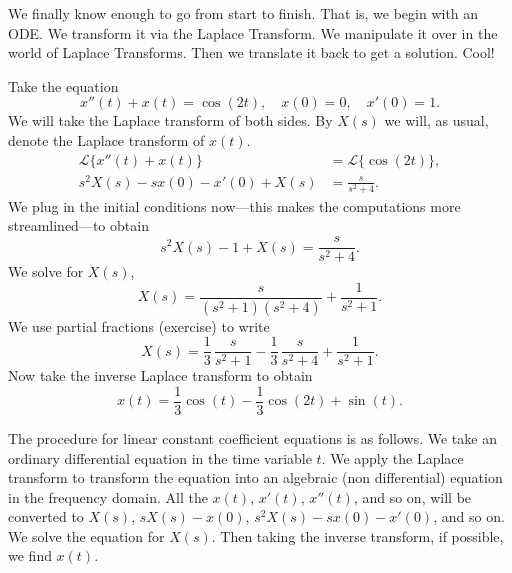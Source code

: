 \begin{video}
	We finally know enough to go from start to finish. That is, we begin with an ODE. We transform it via the Laplace Transform. We manipulate it over in the world of Laplace Transforms. Then we translate it back to get a solution. Cool!
\end{video}

\begin{example}
Take the equation
\begin{equation*}
x''(t) + x(t) = \cos (2t), \quad x(0) = 0, \quad x'(0) = 1 .
\end{equation*}
We will take the Laplace transform of both sides.
By $X(s)$ we will, as usual, denote the Laplace transform of
$x(t)$.
\begin{align*}
\mathcal{L} \bigl\{ x''(t) + x(t) \bigr\} & = \mathcal{L} \bigl\{ \cos (2t) \bigr\} , \\
s^2 X(s) -sx(0)-x'(0) + X(s) & = \frac{s}{s^2 + 4} .
\end{align*}
We plug in the initial conditions now---this makes the computations more
streamlined---to obtain
\begin{equation*}
s^2 X(s) -1 + X(s) = \frac{s}{s^2 + 4} .
\end{equation*}
We solve for $X(s)$,
\begin{equation*}
X(s) = \frac{s}{(s^2+1)(s^2 + 4)} + \frac{1}{s^2+1} .
\end{equation*}
We use partial fractions (exercise) to write
\begin{equation*}
X(s) =\frac{1}{3} \, \frac{s}{s^2+1} - 
\frac{1}{3}\, \frac{s}{s^2+4} + \frac{1}{s^2+1} .
\end{equation*}
Now take the inverse Laplace transform to obtain
\begin{equation*}
x(t) =\frac{1}{3}  \cos (t) -
\frac{1}{3} \cos (2t) + \sin (t) .
\end{equation*}
\end{example}

The procedure for linear constant coefficient equations is as follows.
We take an ordinary differential
equation in the time variable $t$.  We apply the Laplace transform
to transform the equation into an algebraic (non differential) equation in
the frequency domain.  All the $x(t)$, $x'(t)$, $x''(t)$, and so on, will
be converted to $X(s)$, $sX(s) - x(0)$, $s^2X(s) - sx(0) - x'(0)$,
and so on.
We solve the equation for $X(s)$.
Then taking the inverse transform, if possible, we find $x(t)$.

